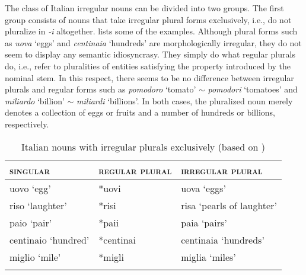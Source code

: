 The class of Italian irregular nouns can be divided into two groups. The first group consists of nouns that take irregular plural forms exclusively, i.e., do not pluralize in \textit{-i} altogether.  lists some of the examples. Although plural forms such as \textit{uova} `eggs' and \textit{centinaia} `hundreds' are morphologically irregular, they do not seem to display any semantic idiosyncrasy. They simply do what regular plurals do, i.e., refer to pluralities of entities satisfying the property introduced by the nominal stem. In this respect, there seems to be no difference between irregular plurals and regular forms such as \textit{pomodoro} `tomato' $\sim$ \textit{pomodori} `tomatoes' and \textit{miliardo} `billion' $\sim$ \textit{miliardi} `billions'. In both cases, the pluralized noun merely denotes a collection of eggs or fruits and a number of hundreds or billions, respectively.\largerpage

\begin{table}[h]
\begin{tabular}{lll}
\lsptoprule
\textsc{singular} & \textsc{regular plural} & \textsc{irregular plural}          \\ \midrule
uovo `egg'          & *uovi          & uova `eggs'               \\
riso `laughter'     & *risi          & risa `pearls of laughter' \\
paio `pair'         & *paii          & paia `pairs'              \\
centinaio `hundred' & *centinai      & centinaia `hundreds'      \\
miglio `mile'       & *migli         & miglia `miles'            \\ \lspbottomrule
\end{tabular}
\caption{Italian nouns with irregular plurals exclusively (based on \citealt[pp. 126--127]{acquaviva2008lexical})}
\label{tab:italian-nouns-irregular-plurals-exclusively}
\end{table}

